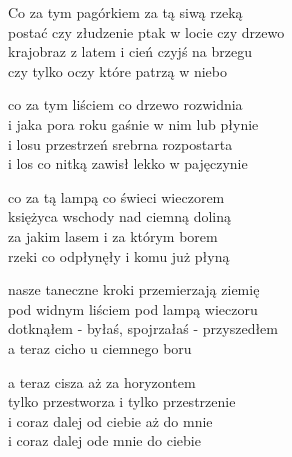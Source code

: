 \begin{text}
    Co za tym pagórkiem za tą siwą rzeką\\
    postać czy złudzenie ptak w locie czy drzewo\\
    krajobraz z latem i cień czyjś na brzegu\\
    czy tylko oczy które patrzą w niebo

    co za tym liściem co drzewo rozwidnia\\
    i jaka pora roku gaśnie w nim lub płynie\\
    i losu przestrzeń srebrna rozpostarta\\
    i los co nitką zawisł lekko w pajęczynie

    co za tą lampą co świeci wieczorem\\
    księżyca wschody nad ciemną doliną\\
    za jakim lasem i za którym borem\\
    rzeki co odpłynęły i komu już płyną

    nasze taneczne kroki przemierzają ziemię\\
    pod widnym liściem pod lampą wieczoru\\
    dotknąłem - byłaś, spojrzałaś - przyszedłem\\
    a teraz cicho u ciemnego boru

    a teraz cisza aż za horyzontem\\
    tylko przestworza i tylko przestrzenie\\
    i coraz dalej od ciebie aż do mnie\\
    i coraz dalej ode mnie do ciebie
\end{text}
\begin{chord}

\end{chord}